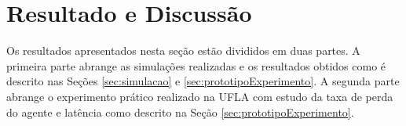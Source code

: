 \section{Resultado e Discussão}
\label{sec:resultados}

Os resultados apresentados nesta seção estão divididos em duas partes. A primeira parte abrange as simulações realizadas e os resultados obtidos como é descrito nas Seções \ref{sec:simulacao} e \ref{sec:prototipoExperimento}. A segunda parte abrange o experimento prático realizado na UFLA com estudo da taxa de perda do agente e latência como descrito na Seção \ref{sec:prototipoExperimento}. 



